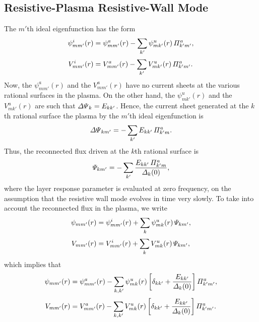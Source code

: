 \documentclass[12pt,prb,aps,notitlepage]{revtex4-1}
\begin{document}
\subsection{Resistive-Plasma Resistive-Wall Mode}
The $m'$th ideal eigenfunction has the form
\begin{align}
\psi^i_{mm'}(r) &= \psi^a_{mm'}(r) - \sum_{k'}\psi^u_{mk'}(r)\,{\mit\Pi}_{k'm'}^a,\\[0.5ex]
V^i_{mm'}(r) &=  V^a_{mm'}(r) - \sum_{k'} V^u_{mk'}(r)\,{\mit\Pi}_{k'm'}^a.
\end{align}
Now, the $\psi^a_{mm'}(r)$ and the $V^a_{mm'}(r)$ have no current sheets at the various rational surfaces in the plasma. 
On the other hand, the $\psi^u_{mk'}(r)$ and  the $V^u_{mk'}(r)$ are such that ${\mit\Delta\Psi}_{k}= E_{kk'}$. Hence, the current sheet generated at the $k$th rational surface the plasma by the $m'$th ideal eigenfunction is
\begin{equation}
{\mit\Delta\Psi}_{km'} = -\sum_{k'}E_{kk'}\,{\mit\Pi}_{k'm}^a.
\end{equation}
Thus, the reconnected flux driven at the $k$th rational surface is
\begin{equation}
{\mit\Psi}_{km'}= -\sum_{k'}\frac{E_{kk'}\,{\mit\Pi}_{k'm}^a}{{\mit\Delta}_k(0)},
\end{equation}
where the layer response parameter is evaluated at zero frequency, on the assumption that the resistive wall mode evolves in time very slowly. 
To take into account the reconnected flux in the plasma, we write
\begin{align}
\psi_{mm'}(r) &=\psi^i_{mm'}(r) + \sum_k \psi^u_{mk}(r)\,{\mit\Psi}_{km'},\\[0.5ex]
V_{mm'}(r) &=  V^i_{mm'}(r) + \sum_k V^u_{mk}(r)\,{\mit\Psi}_{km'},
\end{align}
which implies that
\begin{align}
\psi_{mm'}(r) &= \psi^a_{mm'}(r) - \sum_{k,k'}\psi^u_{mk}(r)\left[\delta_{kk'}+ \frac{E_{kk'}}{{\mit\Delta}_k(0)}\right]{\mit\Pi}_{k'm'}^a,\\[0.5ex]
V_{mm'}(r) &=  V^a_{mm'}(r) - \sum_{k,k'} V^u_{mk}(r)\left[\delta_{kk'}+ \frac{E_{kk'}}{{\mit\Delta}_k(0)}\right]{\mit\Pi}_{k'm'}^a.
\end{align}
\end{document}
